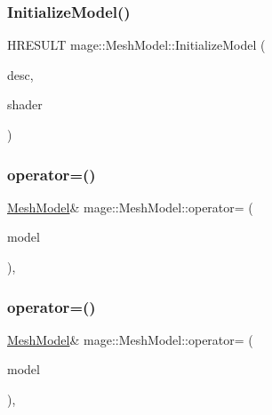 \hypertarget{classmage_1_1_mesh_model_a9971552f5c866b8ed221df056c46a42d}{}\label{classmage_1_1_mesh_model_a9971552f5c866b8ed221df056c46a42d} 
\subsubsection{\texorpdfstring{Initialize\+Model()}{InitializeModel()}}
{\footnotesize\ttfamily H\+R\+E\+S\+U\+LT mage\+::\+Mesh\+Model\+::\+Initialize\+Model (\begin{DoxyParamCaption}\item[{const \hyperlink{classmage_1_1_model_descriptor}{Model\+Descriptor} \&}]{desc,  }\item[{const \hyperlink{structmage_1_1_combined_shader}{Combined\+Shader} \&}]{shader }\end{DoxyParamCaption})\hspace{0.3cm}{\ttfamily [private]}}

\hypertarget{classmage_1_1_mesh_model_a0cffe92f76d2470c67ae71a5a4046259}{}\label{classmage_1_1_mesh_model_a0cffe92f76d2470c67ae71a5a4046259} 
\subsubsection{\texorpdfstring{operator=()}{operator=()}\hspace{0.1cm}{\footnotesize\ttfamily [1/2]}}
{\footnotesize\ttfamily \hyperlink{classmage_1_1_mesh_model}{Mesh\+Model}\& mage\+::\+Mesh\+Model\+::operator= (\begin{DoxyParamCaption}\item[{const \hyperlink{classmage_1_1_mesh_model}{Mesh\+Model} \&}]{model }\end{DoxyParamCaption})\hspace{0.3cm}{\ttfamily [private]}, {\ttfamily [delete]}}

\hypertarget{classmage_1_1_mesh_model_ab01cee26691745ec7cd1af933bb5fa99}{}\label{classmage_1_1_mesh_model_ab01cee26691745ec7cd1af933bb5fa99} 
\subsubsection{\texorpdfstring{operator=()}{operator=()}\hspace{0.1cm}{\footnotesize\ttfamily [2/2]}}
{\footnotesize\ttfamily \hyperlink{classmage_1_1_mesh_model}{Mesh\+Model}\& mage\+::\+Mesh\+Model\+::operator= (\begin{DoxyParamCaption}\item[{\hyperlink{classmage_1_1_mesh_model}{Mesh\+Model} \&\&}]{model }\end{DoxyParamCaption})\hspace{0.3cm}{\ttfamily [private]}, {\ttfamily [delete]}}


